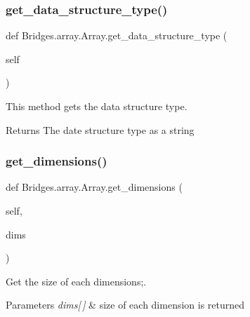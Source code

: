 \subsubsection{\texorpdfstring{get\+\_\+data\+\_\+structure\+\_\+type()}{get\_data\_structure\_type()}}
{\footnotesize\ttfamily def Bridges.\+array.\+Array.\+get\+\_\+data\+\_\+structure\+\_\+type (\begin{DoxyParamCaption}\item[{}]{self }\end{DoxyParamCaption})}



This method gets the data structure type. 

\begin{DoxyReturn}{Returns}
The date structure type as a string 
\end{DoxyReturn}
\mbox{\label{class_bridges_1_1array_1_1_array_ae1c8790e3892cf5fc1498f5f90178d3c}} 
\subsubsection{\texorpdfstring{get\+\_\+dimensions()}{get\_dimensions()}}
{\footnotesize\ttfamily def Bridges.\+array.\+Array.\+get\+\_\+dimensions (\begin{DoxyParamCaption}\item[{}]{self,  }\item[{}]{dims }\end{DoxyParamCaption})}



Get the size of each dimensions;. 


\begin{DoxyParams}{Parameters}
{\em dims\mbox{[}$\,$\mbox{]}} & size of each dimension is returned \\
\hline
\end{DoxyParams}
\mbox{\label{class_bridges_1_1array_1_1_array_a8d726d606d257c1743bc452600f60ebc}} 
